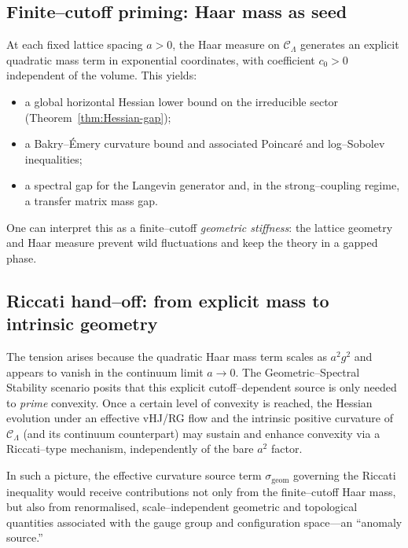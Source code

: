 \documentclass[11pt]{article}
\numberwithin{equation}{section}
\begin{document}
\subsection{Finite--cutoff priming: Haar mass as seed}

At each fixed lattice spacing $a>0$, the Haar measure on
$\mathcal{C}_\Lambda$ generates an explicit quadratic mass term in
exponential coordinates, with coefficient $c_0>0$ independent of the
volume.  This yields:

\begin{itemize}
  \item a global horizontal Hessian lower bound on the irreducible
  sector (Theorem~\ref{thm:Hessian-gap});

  \item a Bakry--\'Emery curvature bound and associated Poincar\'e and
  log--Sobolev inequalities;

  \item a spectral gap for the Langevin generator and, in the
  strong--coupling regime, a transfer matrix mass gap.
\end{itemize}

One can interpret this as a finite--cutoff \emph{geometric stiffness}:
the lattice geometry and Haar measure prevent wild fluctuations and keep
the theory in a gapped phase.

\subsection{Riccati hand--off: from explicit mass to intrinsic geometry}

The tension arises because the quadratic Haar mass term scales as
$a^2 g^2$ and appears to vanish in the continuum limit $a\to 0$.  The
Geometric--Spectral Stability scenario posits that this explicit
cutoff--dependent source is only needed to \emph{prime} convexity.  Once
a certain level of convexity is reached, the Hessian evolution under an
effective vHJ/RG flow and the intrinsic positive curvature of
$\mathcal{C}_\Lambda$ (and its continuum counterpart) may sustain and
enhance convexity via a Riccati--type mechanism, independently of the
bare $a^2$ factor.

In such a picture, the effective curvature source term
$\sigma_{\mathrm{geom}}$ governing the Riccati inequality would receive
contributions not only from the finite--cutoff Haar mass, but also from
renormalised, scale--independent geometric and topological quantities
associated with the gauge group and configuration space---an ``anomaly
source.''
\end{document}
